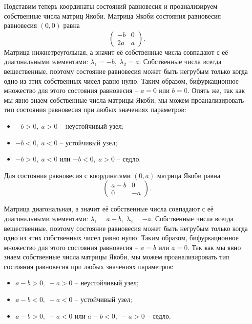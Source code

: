Подставим теперь координаты состояний равновесия и проанализируем собственные числа матриц Якоби. Матрица Якоби состояния равновесия равновесия $(0, 0)$ равна 
$$ \begin{pmatrix}
-b & 0 \\
2a & a 
\end{pmatrix} .$$
Матрица нижнетреугольная, а значит её собственные числа совпадают с её диагональными элементами:
$\lambda_1 = -b, \; \lambda_2 = a$. 
Собственные числа всегда вещественные, поэтому состояние равновесия может быть негрубым только когда одно из этих собственных чисел равно нулю. {\color{blue} Таким образом, бифуркационное множество для этого состояния равновесия -- $a = 0$ или $ b = 0$.} Опять же, так как мы явно знаем собственные числа матрицы Якоби, мы можем проанализировать тип состояния равновесия при любых значениях параметров: 
\begin{itemize}
	\item{$-b > 0, \; a > 0$ -- неустойчивый узел;}
	\item{$-b < 0, \; a < 0$ -- устойчивый узел;}
	\item{$-b > 0, \; a < 0$ или $-b < 0, \; a > 0$ -- седло.}
\end{itemize} 


Для состояния равновесия с координатами $(0, a)$ матрица Якоби равна
$$ \begin{pmatrix}
	a-b & 0 \\
	0 & -a 
\end{pmatrix} .$$

Матрица диагональная, а значит её собственные числа совпадают с её диагональными элементами:
$\lambda_1 = a-b, \; \lambda_2 = -a$. 
Собственные числа всегда вещественные, поэтому состояние равновесия может быть негрубым только когда одно из этих собственных чисел равно нулю. {\color{blue} Таким образом, бифуркационное множество для этого состояния равновесия -- $a = b$ или $ a = 0$.} 
Так как мы явно знаем собственные числа матрицы Якоби, мы можем проанализировать тип состояния равновесия при любых значениях параметров:  
\begin{itemize}
	\item{$a-b > 0, \; -a > 0$ -- неустойчивый узел;}
	\item{$a-b < 0, \; -a < 0$ -- устойчивый узел;}
	\item{$a-b > 0, \; -a < 0$ или $a-b < 0, \; -a > 0$ -- седло.}
\end{itemize}



